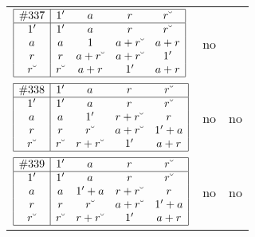 \documentclass[12pt]{article}
\newcommand{\join}{\mathbin{+}}%
\newcommand{\con}[1]{#1\breve{\ }}
\newcommand{\id}{{1'}}%
\renewcommand{\top}{1}%
\begin{document}
\begin{center}
\begin{longtable}{l|c|c}
$
\begin{array}{|c|cccc|} \hline
\#337 & \id & a & r & \con{r} \\ \hline
\id & \id & a & r & \con{r} \\
a & a & \top & a \join \con{r} & a \join r \\
r & r & a \join \con{r} & a \join \con{r} & \id \\
\con{r} & \con{r} & a \join r & \id & a \join r \\ \hline
\end{array}
$
 & no  
 & \adjustbox{valign=c, max height=1.6cm}{$
\left[ \begin{array}{cccccc}
\id & a & r & \con{r} & a & a \\ 
a & \id & a & a & a & r \\ 
\con{r} & a & \id & r & a & a \\ 
r & a & \con{r} & \id & a & a \\ 
a & a & a & a & \id & \con{r} \\ 
a & \con{r} & a & a & r & \id
\end{array}\right]
$}
     \\[15mm]

$
\begin{array}{|c|cccc|} \hline
\#338 & \id & a & r & \con{r} \\ \hline
\id & \id & a & r & \con{r} \\
a & a & \id & r \join \con{r} & r \\
r & r & \con{r} & a \join \con{r} & \id \join a \\
\con{r} & \con{r} & r \join \con{r} & \id & a \join r \\ \hline
\end{array}
$
 & no  
 & no       \\[15mm]

$
\begin{array}{|c|cccc|} \hline
\#339 & \id & a & r & \con{r} \\ \hline
\id & \id & a & r & \con{r} \\
a & a & \id \join a & r \join \con{r} & r \\
r & r & \con{r} & a \join \con{r} & \id \join a \\
\con{r} & \con{r} & r \join \con{r} & \id & a \join r \\ \hline
\end{array}
$
 & no  
 & no       \\[15mm]


\end{longtable}
\end{center}
\end{document}
